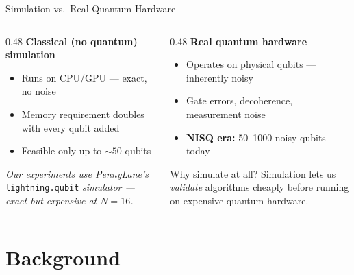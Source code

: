 \documentclass{beamer}
\begin{document}
\begin{frame}{Simulation vs.\ Real Quantum Hardware}

  \begin{columns}[T]
    \begin{column}{0.48\textwidth}
      \textbf{Classical (no quantum) simulation}
      \begin{itemize}\setlength\itemsep{3pt}
        \item Runs on CPU/GPU — exact, no noise
        \item Memory requirement doubles with every qubit added
        \item[$\Rightarrow$] Feasible only up to ${\sim}50$ qubits
      \end{itemize}

      \vspace{6pt}
      \emph{Our experiments use PennyLane's} \texttt{lightning.qubit} \emph{simulator
      — exact but expensive at $N=16$.}
    \end{column}
    \begin{column}{0.48\textwidth}
      \textbf{Real quantum hardware}
      \begin{itemize}\setlength\itemsep{3pt}
        \item Operates on physical qubits — inherently noisy
        \item Gate errors, decoherence, measurement noise
        \item \textbf{NISQ era:} 50--1000 noisy qubits today
      \end{itemize}

      \vspace{6pt}
      \begin{block}{Why simulate at all?}
        Simulation lets us \emph{validate} algorithms cheaply before
        running on expensive quantum hardware.
      \end{block}
    \end{column}
  \end{columns}
\end{frame}


\section{Background}
\end{document}
